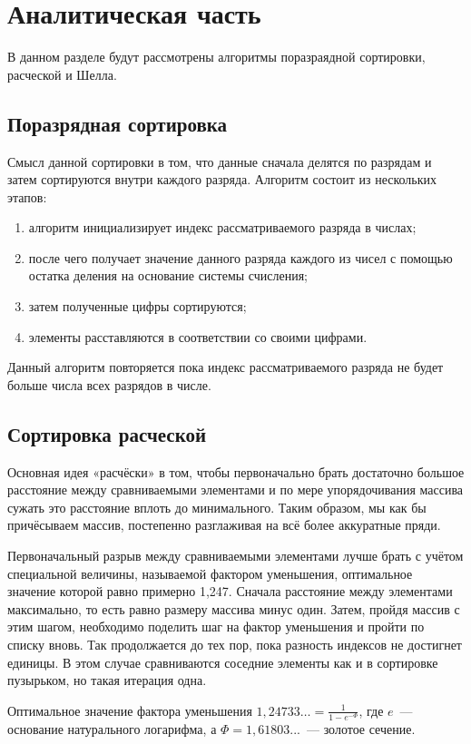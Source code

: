 \chapter{Аналитическая часть}
В данном разделе будут рассмотрены алгоритмы поразраядной сортировки, расческой и Шелла.

\section{Поразрядная сортировка}
Смысл данной сортировки в том, что данные сначала делятся по разрядам и затем сортируются внутри каждого разряда.
Алгоритм состоит из нескольких этапов:
\begin{enumerate}
	\item алгоритм инициализирует индекс рассматриваемого разряда в числах;
	\item после чего получает значение данного разряда каждого из чисел с помощью остатка деления на основание системы счисления;
	\item затем полученные цифры сортируются;
	\item элементы расставляются в соответствии со своими цифрами.
\end{enumerate}
Данный алгоритм повторяется пока индекс рассматриваемого разряда не будет больше числа всех разрядов в числе.~\cite{knut, article_sorts}

\section{Сортировка расческой}
Основная идея «расчёски» в том, чтобы первоначально брать достаточно большое расстояние между сравниваемыми элементами и по мере упорядочивания массива сужать это расстояние вплоть до минимального. 
Таким образом, мы как бы причёсываем массив, постепенно разглаживая на всё более аккуратные пряди. 

Первоначальный разрыв между сравниваемыми элементами лучше брать с учётом специальной величины, называемой фактором уменьшения, оптимальное значение которой равно примерно 1,247. 
Сначала расстояние между элементами максимально, то есть равно размеру массива минус один. Затем, пройдя массив с этим шагом, необходимо поделить шаг на фактор уменьшения и пройти по списку вновь. Так продолжается до тех пор, пока разность индексов не достигнет единицы. В этом случае сравниваются соседние элементы как и в сортировке пузырьком, но такая итерация одна.

Оптимальное значение фактора уменьшения $1,24733\dots = \frac{1}{1 - e^{-\Phi}}$, где $e$~--- основание натурального логарифма, а ${\Phi =1,61803...}$~--- золотое сечение.~\cite{article_sorts}

